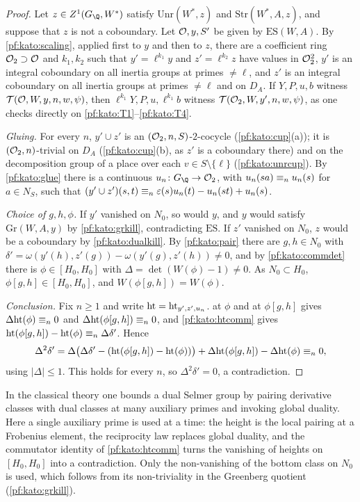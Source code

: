 \begin{proof}
Let $z\in\katoZ(G_\Q,W^*)$ satisfy $\mathrm{Unr}(W^*,z)$ and $\mathrm{Str}(W^*,A,z)$, and suppose that $z$ is not a coboundary. Let
$\mathcal{O},y,S'$ be given by $\mathrm{ES}(W,A)$. By \cref{pf:kato:scaling}, applied first to $y$ and then to $z$, there are a coefficient
ring $\mathcal{O}_2\supset\mathcal{O}$ and $k_1,k_2$ such that $y'=\ell^{k_1}y$ and $z'=\ell^{k_2}z$ have values in $\mathcal{O}_2^2$, $y'$ is an integral
coboundary on all inertia groups at primes $\ne\ell$, and $z'$ is an integral coboundary on all inertia groups at primes $\ne\ell$ and on
$D_A$. If $Y,P,u,b$ witness $\mathcal{T}(\mathcal{O},W,y,n,w,\psi)$, then $\ell^{k_1}Y,P,u,\ell^{k_1}b$ witness
$\mathcal{T}(\mathcal{O}_2,W,y',n,w,\psi)$, as one checks directly on \ref{pf:kato:T1}--\ref{pf:kato:T4}.

\emph{Gluing.} For every $n$, $y'\cup z'$ is an $(\mathcal{O}_2,n,S)$-$2$-cocycle (\cref{pf:kato:cup}(a)); it is $(\mathcal{O}_2,n)$-trivial on $D_A$
(\cref{pf:kato:cup}(b), as $z'$ is a coboundary there) and on the decomposition group of a place over each $v\in S\setminus\{\ell\}$
(\cref{pf:kato:unrcup}). By \cref{pf:kato:glue} there is a continuous $u_n\colon G_\Q\to\katoO_2$, with $u_n(sa)\equiv_{n}u_n(s)$ for
$a\in N_S$, such that $(y'\cup z')(s,t)\equiv_{n}\varepsilon(s)u_n(t)-u_n(st)+u_n(s)$.

\emph{Choice of $g,h,\phi$.} If $y'$ vanished on $N_0$, so would $y$, and $y$ would satisfy $\mathrm{Gr}(W,A,y)$ by \cref{pf:kato:grkill},
contradicting $\mathrm{ES}$. If $z'$ vanished on $N_0$, $z$ would be a coboundary by \cref{pf:kato:dualkill}. By \cref{pf:kato:pair}
there are $g,h\in N_0$ with $\delta'=\omega(y'(h),z'(g))-\omega(y'(g),z'(h))\ne0$, and by \cref{pf:kato:commdet} there is
$\phi\in[H_0,H_0]$ with $\Delta=\det(W(\phi)-1)\ne0$. As $N_0\subset H_0$, $\phi[g,h]\in[H_0,H_0]$, and $W(\phi[g,h])=W(\phi)$.

\emph{Conclusion.} Fix $n\ge1$ and write $\mathrm{ht}=\mathrm{ht}_{y',z',u_n}$.  at $\phi$ and at $\phi[g,h]$ gives
$\Delta\mathrm{ht}(\phi)\equiv_{n}0$ and $\Delta\mathrm{ht}(\phi[g,h])\equiv_{n}0$, and \cref{pf:kato:htcomm} gives
$\mathrm{ht}(\phi[g,h])-\mathrm{ht}(\phi)\equiv_{n}\Delta\delta'$. Hence
\[
  \Delta^2\delta'=\Delta\bigl(\Delta\delta'-(\mathrm{ht}(\phi[g,h])-\mathrm{ht}(\phi))\bigr)+\Delta\mathrm{ht}(\phi[g,h])-\Delta\mathrm{ht}(\phi)\equiv_{n}0,
\]
using $|\Delta|\le1$. This holds for every $n$, so $\Delta^2\delta'=0$, a contradiction.
\end{proof}

\begin{remark}
In the classical theory \cite{Kolyvagin1990,Rubin2000} one bounds a dual Selmer group by pairing derivative classes with dual
classes at many auxiliary primes and invoking global duality. Here a single auxiliary prime is used at a time: the height is the
local pairing at a Frobenius element, the reciprocity law replaces global duality, and the commutator identity of
\cref{pf:kato:htcomm} turns the vanishing of heights on $[H_0,H_0]$ into a contradiction. Only the non-vanishing of the bottom class
on $N_0$ is used, which follows from its non-triviality in the Greenberg quotient (\cref{pf:kato:grkill}).
\end{remark}


